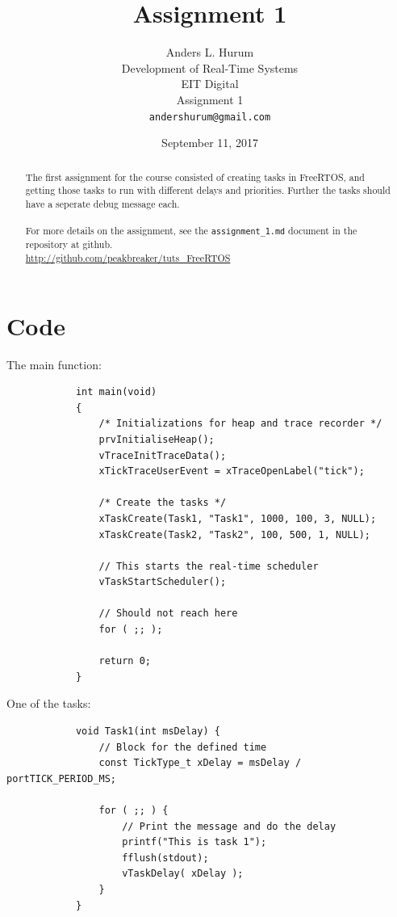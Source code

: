\documentclass[12pt,fleqn,leqno,letterpaper]{article}
\title{Assignment 1}
\author{Anders L. Hurum\\
    \small{Development of Real-Time Systems}\\
    \small{EIT Digital}\\
    \small{Assignment 1}\\
    \small{\texttt{andershurum@gmail.com}}
}
\date{September 11, 2017}
\begin{document}
    \maketitle

    \begin{abstract}
        
        The first assignment for the course consisted of creating tasks in FreeRTOS, 
        and getting those tasks to run with different delays and priorities.  
        Further the tasks should have a seperate debug message each. \\ \\
        For more details on the assignment, see the \texttt{assignment\_1.md} document 
        in the repository at github. \\
        
        \url{http://github.com/peakbreaker/tuts\_FreeRTOS}

    \end{abstract}

    \newpage

    \section*{Code}

        The main function:

        \begin{verbatim}
            int main(void)
            {
                /* Initializations for heap and trace recorder */
                prvInitialiseHeap();    
                vTraceInitTraceData();
                xTickTraceUserEvent = xTraceOpenLabel("tick");
            
                /* Create the tasks */
                xTaskCreate(Task1, "Task1", 1000, 100, 3, NULL);
                xTaskCreate(Task2, "Task2", 100, 500, 1, NULL);
                
                // This starts the real-time scheduler
                vTaskStartScheduler();
                
                // Should not reach here
                for ( ;; );
                
                return 0;
            }
        \end{verbatim}

        One of the tasks:

        \begin{verbatim}
            void Task1(int msDelay) {
                // Block for the defined time
                const TickType_t xDelay = msDelay / portTICK_PERIOD_MS;
            
                for ( ;; ) {
                    // Print the message and do the delay
                    printf("This is task 1");
                    fflush(stdout);
                    vTaskDelay( xDelay );
                }
            }
        \end{verbatim}
\end{document}
